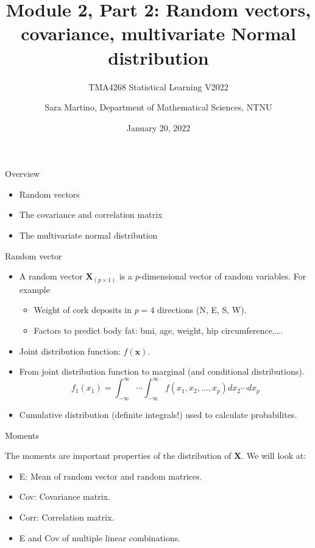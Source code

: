 \documentclass[
  ignorenonframetext,
]{beamer}
\title{Module 2, Part 2: Random vectors, covariance, multivariate Normal
distribution}
\subtitle{TMA4268 Statistical Learning V2022}
\author{Sara Martino, Department of Mathematical Sciences, NTNU}
\date{January 20, 2022}
\providecommand{\tightlist}{%
  \setlength{\itemsep}{0pt}\setlength{\parskip}{0pt}}
\begin{document}
\frame{\titlepage}

\begin{frame}{Overview}
\protect\hypertarget{overview}{}
\normalsize

\begin{itemize}
\item
  Random vectors \vspace{2mm}
\item
  The covariance and correlation matrix \vspace{2mm}
\item
  The multivariate normal distribution
\end{itemize}
\end{frame}

\begin{frame}{Random vector}
\protect\hypertarget{random-vector}{}
\begin{itemize}
\tightlist
\item
  A random vector \(\boldsymbol{X}_{(p\times 1)}\) is a
  \(p\)-dimensional vector of random variables. For example

  \begin{itemize}
  \tightlist
  \item
    Weight of cork deposits in \(p=4\) directions (N, E, S, W).
  \item
    Factors to predict body fat: bmi, age, weight, hip
    circumference,\ldots.
  \end{itemize}
\item
  Joint distribution function: \(f(\boldsymbol{x})\).
\item
  From joint distribution function to marginal (and conditional
  distributions).
  \[f_1(x_1)=\int_{-\infty}^{\infty}\cdots \int_{-\infty}^{\infty} f(x_1,x_2,\ldots,x_p)dx_2 \cdots dx_p\]
\item
  Cumulative distribution (definite integrals!) used to calculate
  probabilites.
\end{itemize}
\end{frame}

\begin{frame}
\begin{block}{Moments}
\protect\hypertarget{moments}{}
\vspace{2mm}

The moments are important properties of the distribution of
\(\boldsymbol{X}\). We will look at:

\vspace{2mm}

\begin{itemize}
\tightlist
\item
  E: Mean of random vector and random matrices.
\item
  Cov: Covariance matrix.
\item
  Corr: Correlation matrix.
\item
  E and Cov of multiple linear combinations.
\end{itemize}
\end{block}
\end{frame}
\end{document}
